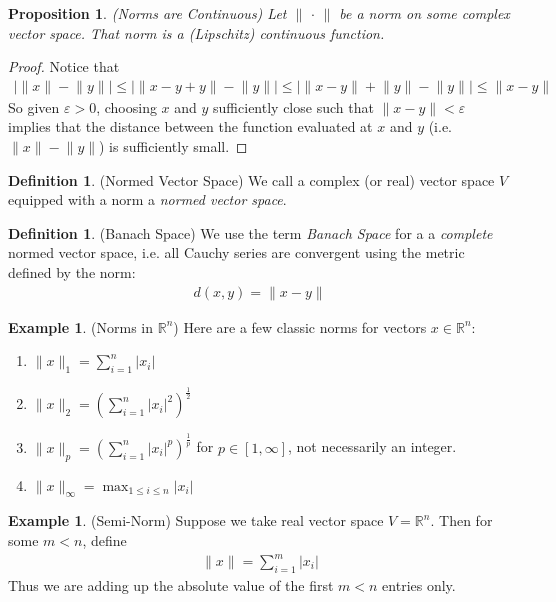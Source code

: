 \documentclass[12pt]{article}
\numberwithin{equation}{section} %
\theoremstyle{plain}
\newtheorem{prop}[thm]{Proposition}
\theoremstyle{definition}
\newtheorem{defn}[thm]{Definition}
\newtheorem{ex}[thm]{Example}
\theoremstyle{remark}
\newcommand{\Rn}{\mathbb{R}^n}
\begin{document}
\begin{prop}\emph{(Norms are Continuous)}
Let $\lVert \,\cdot\,\rVert$ be a norm on some complex vector space.
That norm is a (Lipschitz) continuous function.
\end{prop}
\begin{proof}
Notice that
\begin{align*}
    \big\lvert \lVert x \rVert - \lVert y\rVert \big\rvert
    \leq
    \big\lvert \lVert x - y + y\rVert - \lVert y\rVert \big\rvert
    \leq
    \big\lvert \lVert x - y \rVert + \lVert y\rVert - \lVert y\rVert \big\rvert
    \leq
    \lVert x - y \rVert
\end{align*}
So given $\varepsilon>0$, choosing $x$ and $y$ sufficiently close such
that $\lVert x-y\rVert<\varepsilon$ implies that the distance between
the function evaluated at $x$ and $y$ (i.e.
$\lVert x\rVert- \lVert y\rVert$) is sufficiently small.
\end{proof}

\begin{defn}(Normed Vector Space)
We call a complex (or real) vector space $V$ equipped with a norm a
\emph{normed vector space}.
\end{defn}


\begin{defn}(Banach Space)
We use the term \emph{Banach Space} for a a \emph{complete} normed
vector space, i.e. all Cauchy series are convergent using the metric
defined by the norm:
\begin{align*}
  d(x,y) = \lVert x-y\rVert
\end{align*}
\end{defn}

\begin{ex}(Norms in $\Rn$)
Here are a few classic norms for vectors $x\in \Rn$:
\begin{enumerate}
\item $\lVert x\rVert_1 = \sum^n_{i=1} |x_i|$
\item $\lVert x\rVert_2 = \left(\sum_{i=1}^n |x_i|^2\right)^{\frac{1}{2}}$
\item $\lVert x\rVert_p = \left(\sum_{i=1}^n
  |x_i|^p\right)^{\frac{1}{p}}$ for $p\in[1,\infty]$, not necessarily an
  integer.
\item $\lVert x\rVert_\infty = \max_{1\leq i\leq n} |x_i|$
\end{enumerate}
\end{ex}

\begin{ex}(Semi-Norm)
Suppose we take real vector space $V=\Rn$. Then for some $m<n$, define
\begin{align*}
  \lVert x\rVert = \sum_{i=1}^m |x_i|
\end{align*}
Thus we are adding up the absolute value of the first $m<n$ entries
only.
\end{ex}
\end{document}
